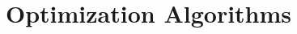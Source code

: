 \setcounter{chapter}{4}

\hypertarget{optimization-algorithms}{%
\chapter{Optimization Algorithms}\label{optimization-algorithms}}
